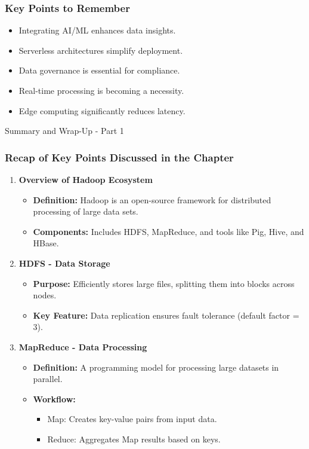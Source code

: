 \documentclass[aspectratio=169]{beamer}
\begin{document}
\begin{frame}[fragile]
    \frametitle{Key Points to Remember}
    \begin{itemize}
        \item Integrating AI/ML enhances data insights.
        \item Serverless architectures simplify deployment.
        \item Data governance is essential for compliance.
        \item Real-time processing is becoming a necessity.
        \item Edge computing significantly reduces latency.
    \end{itemize}
\end{frame}

\begin{frame}[fragile]{Summary and Wrap-Up - Part 1}
    \frametitle{Recap of Key Points Discussed in the Chapter}
    
    \begin{enumerate}
        \item \textbf{Overview of Hadoop Ecosystem}
            \begin{itemize}
                \item \textbf{Definition:} Hadoop is an open-source framework for distributed processing of large data sets.
                \item \textbf{Components:} Includes HDFS, MapReduce, and tools like Pig, Hive, and HBase.
            \end{itemize}
        
        \item \textbf{HDFS - Data Storage}
            \begin{itemize}
                \item \textbf{Purpose:} Efficiently stores large files, splitting them into blocks across nodes.
                \item \textbf{Key Feature:} Data replication ensures fault tolerance (default factor = 3).
            \end{itemize}
        
        \item \textbf{MapReduce - Data Processing}
            \begin{itemize}
                \item \textbf{Definition:} A programming model for processing large datasets in parallel.
                \item \textbf{Workflow:} 
                \begin{itemize}
                    \item Map: Creates key-value pairs from input data.
                    \item Reduce: Aggregates Map results based on keys.
                \end{itemize}
            \end{itemize}
    \end{enumerate}
\end{frame}
\end{document}
